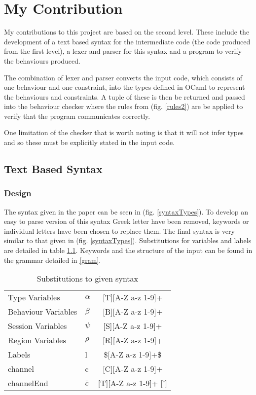 \chapter{My Contribution} \label{chapMyWork}

My contributions to this project are based on the second level. These include the development of a text based syntax for the intermediate code (the code produced from the first level), a lexer and parser for this syntax and a program to verify the behaviours produced. 

The combination of lexer and parser converts the input code, which consists of one behaviour and one constraint, into the types defined in OCaml to represent the behaviours and constraints. A tuple of these is then be returned and passed into the behaviour checker where the rules from (fig. \ref{rules2}) are be applied to verify that the program communicates correctly. 

One limitation of the checker that is worth noting is that it will not infer types and so these must be explicitly stated in the input code. 

\section{Text Based Syntax} \label{text}

\subsection {Design} 
The syntax given in the paper can be seen in (fig. \ref{syntaxTypes}). To develop an easy to parse version of this syntax Greek letter have been removed, keywords or individual letters have been chosen to replace them. The final syntax is very similar to that given in (fig. \ref{syntaxTypes}). Substitutions for variables and labels are detailed in table \ref{tabSyntaxSubs}. Keywords and the structure of the input can be found in the grammar detailed in \ref{gram}.

\begin{table}
\begin{tabular}{l l c }
Type Variables & $\alpha$ & [T][A-Z a-z 1-9]+ \\
Behaviour Variables &$\beta$ & [B][A-Z a-z 1-9]+ \\
Session Variables & $\psi$ & [S][A-Z a-z 1-9]+ \\
Region Variables & $\rho$ & [R][A-Z a-z 1-9]+ \\
Labels & l & \$[A-Z a-z 1-9]+\$ \\
channel & c & [C][A-Z a-z 1-9]+  \\
channelEnd & $\bar{c}$ &[T][A-Z a-z 1-9]+ ['] \\
\end{tabular}
\caption{Substitutions to given syntax}
\label{tabSyntaxSubs}
\end{table}

